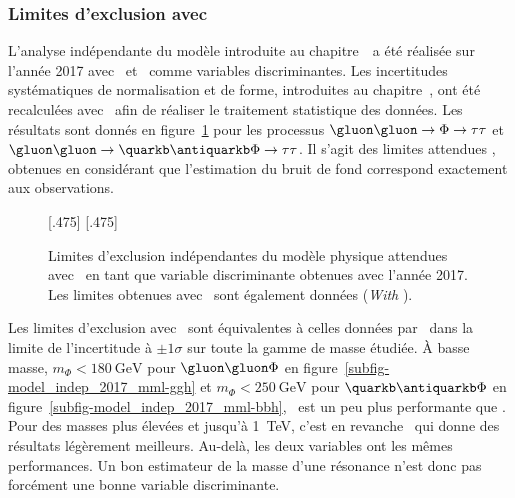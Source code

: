 \subsubsection{Limites d'exclusion avec \mml}
L'analyse indépendante du modèle introduite au chapitre~\ a été réalisée
sur l'année 2017
avec \mTtot\ et \mml\ comme variables discriminantes.
Les incertitudes systématiques de normalisation et de forme, introduites au chapitre~, ont été recalculées avec \mml\ afin de réaliser le traitement statistique des données.
Les résultats
sont donnés en figure~\ref{fig-model_indep_2017_mml}
pour les processus $\gluon\gluon\to\Phi\to\tau\tau$ et $\gluon\gluon\to\quarkb\antiquarkb\Phi\to\tau\tau$.
Il s'agit des limites \og attendues \fg{},
obtenues en considérant que l'estimation du bruit de fond correspond exactement aux observations.
\begin{figure}[h]
\centering

[.475\textwidth]
{}
\hfill
{}[.475\textwidth]
{}


\caption[Limites d'exclusion indépendantes avec \mml\ en 2017.]{Limites d'exclusion indépendantes du modèle physique attendues avec \mml\ en tant que variable discriminante obtenues avec l'année 2017. Les limites obtenues avec \mTtot\ sont également données (\emph{With \mTtot}).}
\label{fig-model_indep_2017_mml}
\end{figure}
\par
Les limites d'exclusion avec \mml\ sont équivalentes à celles données par \mTtot\
dans la limite de l'incertitude à $\pm1\sigma$
sur toute la gamme de masse étudiée.
À basse masse,
$m_\Phi<\SI{180}{\GeV}$ pour $\gluon\gluon\Phi$ en figure~\ref{subfig-model_indep_2017_mml-ggh}
et
$m_\Phi<\SI{250}{\GeV}$ pour $\quarkb\antiquarkb\Phi$ en figure~\ref{subfig-model_indep_2017_mml-bbh},
\mml\ est un peu plus performante que \mTtot.
Pour des masses plus élevées et jusqu'à \SI{1}{\TeV},
c'est en revanche \mTtot\ qui donne des résultats légèrement meilleurs.
Au-delà, les deux variables ont les mêmes performances.
Un bon estimateur de la masse d'une résonance n'est donc pas forcément une bonne variable discriminante.
